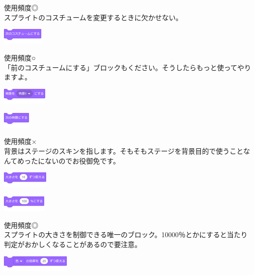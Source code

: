 \documentclass[b5paper,10pt]{jsarticle}
\begin{document}
\begin{multicols*}{3}
\begin{itembox}{5}
\end{itembox}
使用頻度◎\\
スプライトのコスチュームを変更するときに欠かせない。
\begin{itembox}{6}
\includegraphics[height=8mm]{images/looks_6.png}
\end{itembox}
使用頻度○\\
「前のコスチュームにする」ブロックもください。そうしたらもっと使ってやりますよ。
\begin{itembox}{7}
\includegraphics[height=8mm]{images/looks_7.png}

\includegraphics[height=8mm]{images/looks_8.png}
\end{itembox}
使用頻度×\\
背景はステージのスキンを指します。そもそもステージを背景目的で使うことなんてめったにないのでお役御免です。
\begin{itembox}{8}
\includegraphics[height=8mm]{images/looks_9.png}

\includegraphics[height=8mm]{images/looks_10.png}
\end{itembox}
使用頻度◎\\
スプライトの大きさを制御できる唯一のブロック。10000％とかにすると当たり判定がおかしくなることがあるので要注意。
\begin{itembox}{9}
\includegraphics[height=8mm]{images/looks_11.png}


\end{itembox}
\end{multicols*}
\end{document}
